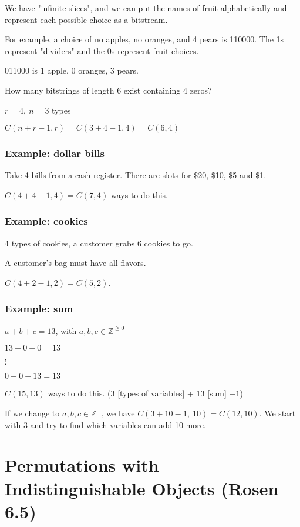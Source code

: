 \documentclass[english,openany]{book}
\begin{document}
    We have "infinite slices", and we can put the names of fruit alphabetically and represent each possible choice as a bitstream.

    For example, a choice of no apples, no oranges, and 4 pears is 110000. The 1s represent "dividers" and the 0s represent fruit choices.

    011000 is 1 apple, 0 oranges, 3 pears.

    How many bitstrings of length 6 exist containing 4 zeros?

    $r = 4,\ n = 3$ types

    $C(n+r-1, r) = C(3+4-1, 4) = C(6,4)$\\

    \subsubsection{Example: dollar bills}

    Take 4 bills from a cash register. There are slots for \$20, \$10, \$5 and \$1.

    $C(4+4-1, 4) = C(7,4)$ ways to do this.\\

    \subsubsection{Example: cookies}

    4 types of cookies, a customer grabs 6 cookies to go.

    A customer's bag must have all flavors.

    $C(4+2-1, 2) = C(5,2)$.\\

    \subsubsection{Example: sum}

    $a+b+c = 13$, with $a,b,c \in \mathbb Z^{\geq 0}$

    $13 + 0 + 0 = 13$

    $\vdots$

    $0 + 0 + 13 = 13$

    $C(15,13)$ ways to do this. (3 [types of variables] + 13 [sum] $- 1$)

    If we change to $a,b,c \in \mathbb Z^+$, we have $C(3 + 10 - 1,\ 10) = C(12,10)$. We start with 3 and try to find which variables can add 10 more.

    \newpage
    \section{Permutations with Indistinguishable Objects (Rosen 6.5)}
\end{document}
